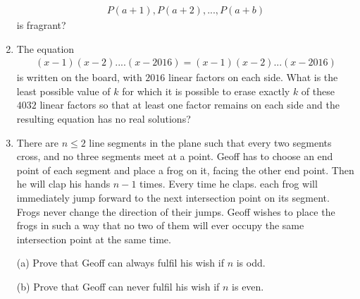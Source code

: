 \documentclass[12pt,-letter paper]{article}
\begin{document}
\begin{enumerate}
	\begin{align}{P(a + 1), P(a + 2) ,...,P(a+b)}\end{align}
is fragrant?	
\item The equation \begin{align}(x - 1)(x - 2)....(x-2016)=(x-1)(x-2)...(x-2016)\end{align} is written on the board, with $2016$ linear factors on each side. What is the least possible value of $k$ for which it is possible to erase exactly $k$ of these $4032$ linear factors so that at least one factor remains on each side and the resulting equation has no real solutions?
\item There are $n\leq 2$ line segments in the plane such that every two segments cross, and no three segments meet at a point. Geoff has to choose an end point of each segment and place a frog on it, facing the other end point. Then he will clap his hands $n-1$ times. Every time he claps. each frog will immediately jump forward to the next intersection point on its segment. Frogs never change the direction of their jumps. Geoff wishes to place the frogs in such a way that no two of them will ever occupy the same intersection point at the same time.

(a) Prove that Geoff can always fulfil his wish if $n$ is odd.

(b) Prove that Geoff can never fulfil his wish if $n$ is even.


\end{enumerate}
\end{document}
